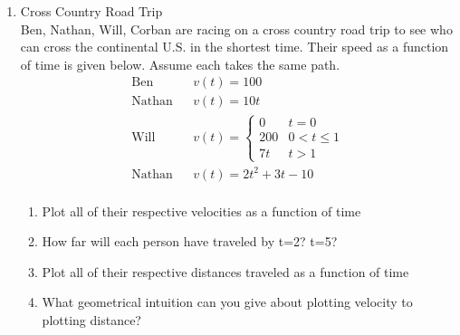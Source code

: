 \documentclass{article}
\begin{document}
\begin{enumerate}
    \item Cross Country Road Trip\\
    Ben, Nathan, Will, Corban are racing on a cross country road trip to see who can cross the continental U.S. in the shortest time. Their speed as a function of time is given below. Assume each takes the same path.
    \begin{align*}
    \text{Ben} && v(t)=100\\
    \text{Nathan} && v(t) = 10t\\
    \text{Will} && v(t) = \begin{cases} 
      0 & t= 0 \\
      200 & 0 < t\leq 1 \\
      7t & t > 1 
      \end{cases}\\
     \text{Nathan} && v(t) = 2t^2 + 3t - 10\\
    \end{align*}
    \begin{enumerate}
        \item Plot all of their respective velocities as a function of time
        \item How far will each person have traveled by t=2? t=5?
        \item Plot all of their respective distances traveled as a function of time
        \item What geometrical intuition can you give about plotting velocity to plotting distance?
    \end{enumerate}

\end{enumerate}
\end{document}
